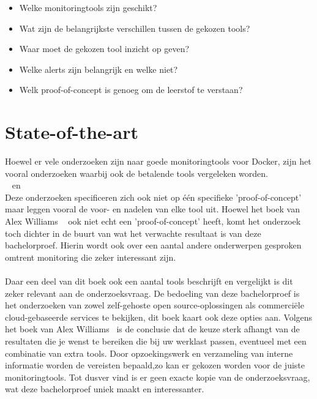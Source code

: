 \begin{itemize}
    \item Welke monitoringtools zijn geschikt?
    \item Wat zijn de belangrijkste verschillen tussen de gekozen tools?
    \item Waar moet de gekozen tool inzicht op geven?
    \item Welke alerts zijn belangrijk en welke niet?
    \item Welk proof-of-concept is genoeg om de leerstof te verstaan?
\end{itemize}


\section{State-of-the-art}
\label{sec:state-of-the-art}
Hoewel er vele onderzoeken zijn naar goede monitoringtools voor Docker, zijn het vooral onderzoeken waarbij ook de betalende tools vergeleken worden.\\~\autocite{Ribenzaft2020} en ~\autocite{Cirelly2020}\\ Deze onderzoeken specificeren zich ook niet op één specifieke 'proof-of-concept' maar leggen vooral de voor- en nadelen van elke tool uit.
Hoewel het boek van Alex Williams ~\autocite{Cole2016} ook niet echt een 'proof-of-concept' heeft, komt het onderzoek toch dichter in de buurt van wat het verwachte resultaat is van deze bachelorproef. Hierin wordt ook over een aantal andere onderwerpen gesproken omtrent monitoring die zeker interessant zijn. 
\\
\\
Daar een deel van dit boek ook een aantal tools beschrijft en vergelijkt is dit zeker relevant aan de onderzoeksvraag. De bedoeling van deze bachelorproef is het onderzoeken van zowel zelf-gehoste open source-oplossingen als commerciële cloud-gebaseerde services te bekijken, dit boek kaart ook deze opties aan. Volgens het boek van Alex Williams~\autocite{Cole2016} is de conclusie dat de keuze sterk afhangt van de resultaten die je wenst te bereiken die bij uw werklast passen, eventueel met een combinatie van extra tools. Door opzoekingswerk en verzameling van interne informatie worden de vereisten bepaald,zo kan er gekozen worden voor de juiste monitoringtools. Tot dusver vind is er geen exacte kopie van de onderzoeksvraag, wat deze bachelorproef uniek maakt en interessanter.

